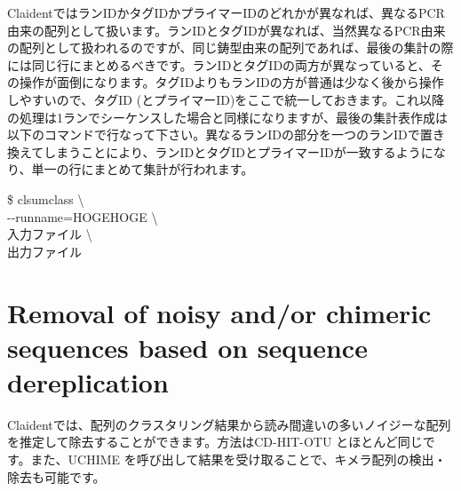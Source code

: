\documentclass[titlepage,10pt,a4paper,english]{jsbook}
\newenvironment{cmd}{\begin{oframed}\raggedright\ttfamily\footnotesize\setlength{\baselineskip}{1.4em}}{\end{oframed}\vspace{-1em}}
\begin{document}
ClaidentではランIDかタグIDかプライマーIDのどれかが異なれば、異なるPCR由来の配列として扱います。ランIDとタグIDが異なれば、当然異なるPCR由来の配列として扱われるのですが、同じ鋳型由来の配列であれば、最後の集計の際には同じ行にまとめるべきです。ランIDとタグIDの両方が異なっていると、その操作が面倒になります。タグIDよりもランIDの方が普通は少なく後から操作しやすいので、タグID (とプライマーID)をここで統一しておきます。これ以降の処理は1ランでシーケンスした場合と同様になりますが、最後の集計表作成は以下のコマンドで行なって下さい。異なるランIDの部分を一つのランIDで置き換えてしまうことにより、ランIDとタグIDとプライマーIDが一致するようになり、単一の行にまとめて集計が行われます。
\begin{cmd}
\$ clsumclass {\textbackslash}\\
{-}{-}runname=HOGEHOGE {\textbackslash}\\
入力ファイル {\textbackslash}\\
出力ファイル
\end{cmd}

\section{Removal of noisy and/or chimeric sequences based on sequence dereplication}

Claidentでは、配列のクラスタリング結果から読み間違いの多いノイジーな配列を推定して除去することができます。方法はCD-HIT-OTU \citep{Li2012}とほとんど同じです。また、UCHIME \citep{Edgar2011}を呼び出して結果を受け取ることで、キメラ配列の検出・除去も可能です。
\end{document}
